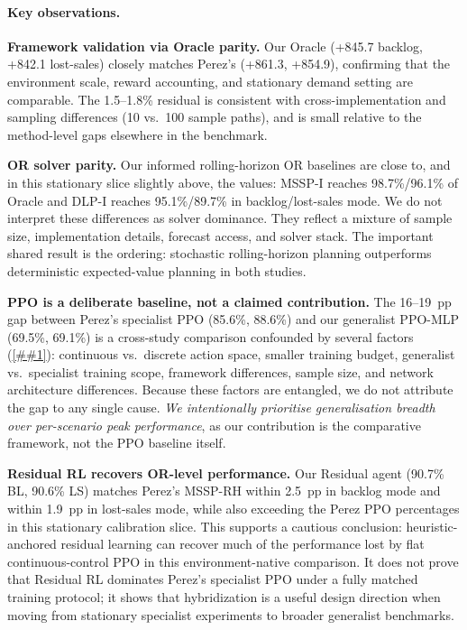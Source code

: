 \documentclass[10pt,a4paper]{article}
\providecommand{\Cref}[1]{\ref{##1}}
\let\origenumerate\enumerate
\let\endorigenumerate\endenumerate
\renewenvironment{enumerate}[1][]{\origenumerate}{\endorigenumerate}
\begin{document}
\paragraph{Key observations.}
\begin{enumerate}[nosep]
\item \textbf{Framework validation via Oracle parity.}
      Our Oracle (+845.7 backlog, +842.1 lost-sales)
      closely matches Perez's (+861.3, +854.9), confirming
      that the environment scale, reward accounting, and stationary
      demand setting are comparable.  The 1.5--1.8\% residual is
      consistent with cross-implementation and sampling differences
      (10 vs.\ 100 sample paths), and is small relative to the
      method-level gaps elsewhere in the benchmark.
\item \textbf{OR solver parity.}
      Our informed rolling-horizon OR baselines are close to, and in
      this stationary slice slightly above, the \citet{perez2021} values:
      MSSP-I reaches 98.7\%/96.1\% of Oracle and DLP-I reaches
      95.1\%/89.7\% in backlog/lost-sales mode.  We do not interpret
      these differences as solver dominance.  They reflect a mixture
      of sample size, implementation details, forecast access, and
      solver stack.  The important shared result is the ordering:
      stochastic rolling-horizon planning outperforms deterministic
      expected-value planning in both studies.
\item \textbf{PPO is a deliberate baseline, not a claimed contribution.}
      The 16--19~pp gap between Perez's specialist PPO
      (85.6\%, 88.6\%) and our generalist PPO-MLP (69.5\%,
      69.1\%) is a cross-study comparison confounded by several
      factors (\Cref{tab:methodology_delta}): continuous vs.\
      discrete action space, smaller training budget, generalist
      vs.\ specialist training scope, framework differences, sample
      size, and network architecture differences.
      Because these factors are entangled, we do not attribute
      the gap to any single cause.
      \emph{We intentionally prioritise generalisation breadth
      over per-scenario peak performance}, as our contribution
      is the comparative framework, not the PPO baseline itself.
\item \textbf{Residual RL recovers OR-level performance.}
      Our Residual agent (90.7\% BL, 90.6\% LS) matches
      Perez's MSSP-RH within 2.5~pp in backlog mode and within
      1.9~pp in lost-sales mode, while also exceeding the Perez PPO
      percentages in this stationary calibration slice.  This supports a cautious
      conclusion: heuristic-anchored residual learning can recover
      much of the performance lost by flat continuous-control PPO in
      this environment-native comparison.  It does not prove that
      Residual RL dominates Perez's specialist PPO under a fully
      matched training protocol; it shows that hybridization is a
      useful design direction when moving from stationary specialist
      experiments to broader generalist benchmarks.
\end{enumerate}
\end{document}
